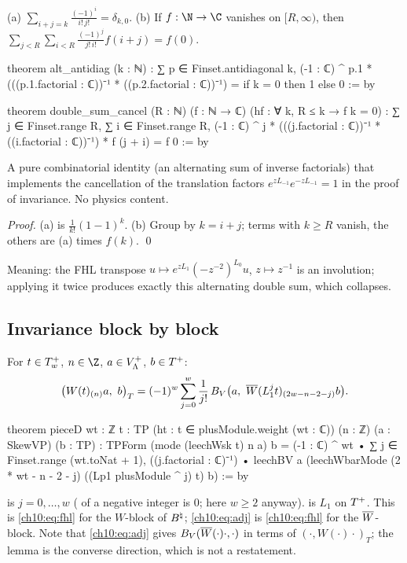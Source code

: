\begin{lemma}\label{ch10:lem:doublesum}
(a) $\sum_{i+j=k}\frac{(-1)^i}{i!\,j!}=\delta_{k,0}$.
(b) If $f:\N\to\C$ vanishes on $[R,\infty)$, then
$\sum_{j<R}\sum_{i<R}\frac{(-1)^j}{j!\,i!}f(i+j)=f(0)$.
\end{lemma}
\begin{leancode}
theorem alt_antidiag (k : ℕ) :
    ∑ p ∈ Finset.antidiagonal k,
      (-1 : ℂ) ^ p.1 * (((p.1.factorial : ℂ))⁻¹ * ((p.2.factorial : ℂ))⁻¹)
      = if k = 0 then 1 else 0 := by

theorem double_sum_cancel (R : ℕ) (f : ℕ → ℂ) (hf : ∀ k, R ≤ k → f k = 0) :
    ∑ j ∈ Finset.range R, ∑ i ∈ Finset.range R,
      (-1 : ℂ) ^ j * (((j.factorial : ℂ))⁻¹ * ((i.factorial : ℂ))⁻¹) * f (j + i) = f 0 := by
\end{leancode}

\begin{physics}
A pure combinatorial identity (an alternating sum of inverse factorials) that implements the cancellation of the translation factors $e^{zL_{-1}}e^{-zL_{-1}}=1$ in the proof of invariance. No physics content.
\end{physics}

\emph{Proof.} (a) is $\frac1{k!}(1-1)^k$.  (b) Group by $k=i+j$; terms with $k\ge R$ vanish, the
others are (a) times $f(k)$. \qed

Meaning: the FHL transpose $u\mapsto e^{zL_1}(-z^{-2})^{L_0}u$, $z\mapsto z^{-1}$ is an involution;
applying it twice produces exactly this alternating double sum, which collapses.

\subsection{Invariance block by block}

\begin{lemma}\label{ch10:lem:pieceD}
For $t\in T^{+}_w$, $n\in\Z$, $a\in V_{\Lambda}^{+}$, $b\in T^{+}$:
\begin{equation*}
 \bigl(W(t)_{(n)}a,\ b\bigr)_T=(-1)^w\sum_{j=0}^{w}\frac1{j!}\,
 B_V\bigl(a,\ \chtenWb(L_1^jt)_{(2w-n-2-j)}b\bigr).
\end{equation*}
\end{lemma}
\begin{leancode}
theorem pieceD {wt : ℤ} {t : TP} (ht : t ∈ plusModule.weight (wt : ℂ)) (n : ℤ) (a : SkewVP)
    (b : TP) :
    TPForm (mode (leechWsk t) n a) b = (-1 : ℂ) ^ wt • ∑ j ∈ Finset.range (wt.toNat + 1),
      ((j.factorial : ℂ)⁻¹) • leechBV a (leechWbarMode (2 * wt - n - 2 - j)
        ((Lp1 plusModule ^ j) t) b) := by
\end{leancode}
\begin{dictionary}
 is $j=0,\dots,w$ ( of a negative integer is $0$;
here $w\ge2$ anyway).   is $L_1$ on $T^{+}$.  This is \eqref{ch10:eq:fhl} for
the $W$-block of $B^{\natural}$; \eqref{ch10:eq:adj} is \eqref{ch10:eq:fhl} for the $\overline{W}$-block.  Note
that \eqref{ch10:eq:adj} gives $B_V(\overline{W}(\cdot)\cdot,\cdot)$ in terms of $(\cdot,W(\cdot)\cdot)_T$;
the lemma is the converse direction, which is not a restatement.
\end{dictionary}

